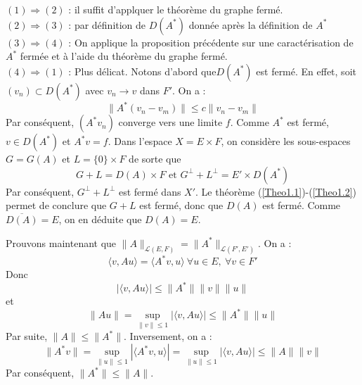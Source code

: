 \begin{dem}
$(1)\Rightarrow (2)$ : il suffit d'applquer le théorème du graphe fermé.\\
$(2)\Rightarrow (3)$ : par définition de $D(A^*)$ donnée après la définition de $A^*$\\
$(3)\Rightarrow (4)$ : On applique la proposition précédente sur une caractérisation de $A^*$ fermée et à l'aide du théorème du graphe fermé.\\
$(4)\Rightarrow (1)$ : Plus délicat. Notons d'abord que$D(A^*)$ est fermé. En effet, soit $(v_n)\subset D(A^*)$ avec $v_n\to v$ dans $F'$. On a : 
\[\|A^*(v_n-v_m)\|\leq c\|v_n-v_m\|\]
Par conséquent, $(A^*v_n)$ converge vers une limite $f$. Comme $A^*$ est fermé, $v\in D(A^*)$ et $A^*v=f$. Dans l'espace $X=E\times F$, on considère les sous-espaces $G=G(A)$ et $L=\{0\}\times F$ de sorte que \[G+L=D(A)\times F \text{ et } G^\perp+L^\perp=E'\times D(A^*)\]
Par conséquent, $G^\perp+L^\perp$ est fermé dans $X'$. Le théorème (\ref{Theo1.1})-(\ref{Theo1.2}) permet de conclure que $G+L$ est fermé, donc que $D(A)$ est fermé. Comme $\overline{D(A)}=E$, on en déduite que $D(A)=E$.

\bigskip
Prouvons maintenant que $\|A\|_{\mathcal{L}(E,F)}=\|A^*\|_{\mathcal{L}(F',E')}$. On a : 
	\[\langle v, Au\rangle=\langle A^*v, u\rangle\ \forall u\in E,\ \forall v\in F'\]
Donc \[|\langle v, Au\rangle| \leq \|A^*\|\|v\|\|u\|\] et 
	\[\|Au\|=\sup_{\|v\|\leq 1}|\langle v, Au\rangle| \leq \|A^*\|\|u\|\]
Par suite, $\|A\|\leq \|A^*\|$. Inversement, on a : 
\[\|A^* v\|=\sup_{\|u\|\leq 1}|\langle A^*v, u\rangle|=\sup_{\|u\|\leq 1}|\langle v, Au\rangle|\leq \|A\|\|v\|\]
Par conséquent, $\|A^*\|\leq \|A\|$.
\end{dem}

